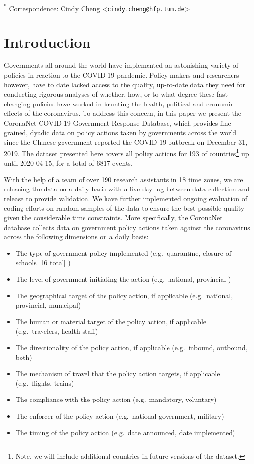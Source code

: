 \documentclass[]{article}
\providecommand{\tightlist}{%
  \setlength{\itemsep}{0pt}\setlength{\parskip}{0pt}}
\let\rmarkdownfootnote\footnote%
\def\footnote{\protect\rmarkdownfootnote}
\begin{document}
\textsuperscript{*} Correspondence: \href{mailto:cindy.cheng@hfp.tum.de}{Cindy Cheng \textless{}\href{mailto:cindy.cheng@hfp.tum.de}{\nolinkurl{cindy.cheng@hfp.tum.de}}\textgreater{}}

\hypertarget{introduction}{%
\section{Introduction}\label{introduction}}

Governments all around the world have implemented an astonishing variety of policies in reaction to the COVID-19 pandemic. Policy makers and researchers however, have to date lacked access to the quality, up-to-date data they need for conducting rigorous analyses of whether, how, or to what degree these fast changing policies have worked in brunting the health, political and economic effects of the coronavirus. To address this concern, in this paper we present the CoronaNet COVID-19 Government Response Database, which provides fine-grained, dyadic data on policy actions taken by governments across the world since the Chinese government reported the COVID-19 outbreak on December 31, 2019. The dataset presented here covers all policy actions for 193 of countries\footnote{Note, we will include additional countries in future versions of the dataset.} up until 2020-04-15, for a total of 6817 events.

With the help of a team of over 190 research assistants in 18 time zones, we are releasing the data on a daily basis with a five-day lag between data collection and release to provide validation. We have further implemented ongoing evaluation of coding efforts on random samples of the data to ensure the best possible quality given the considerable time constraints. More specifically, the CoronaNet database collects data on government policy actions taken against the coronavirus across the following dimensions on a daily basis:

\begin{itemize}
\tightlist
\item
  The type of government policy implemented (e.g.~quarantine, closure of schools {[}16 total{]} )
\item
  The level of government initiating the action (e.g.~national, provincial )
\item
  The geographical target of the policy action, if applicable (e.g.~national, provincial, municipal)
\item
  The human or material target of the policy action, if applicable (e.g.~travelers, health staff)
\item
  The directionality of the policy action, if applicable (e.g.~inbound, outbound, both)
\item
  The mechanism of travel that the policy action targets, if applicable (e.g.~flights, trains)
\item
  The compliance with the policy action (e.g.~mandatory, voluntary)
\item
  The enforcer of the policy action (e.g.~national government, military)
\item
  The timing of the policy action (e.g.~date announced, date implemented)
\end{itemize}
\end{document}
